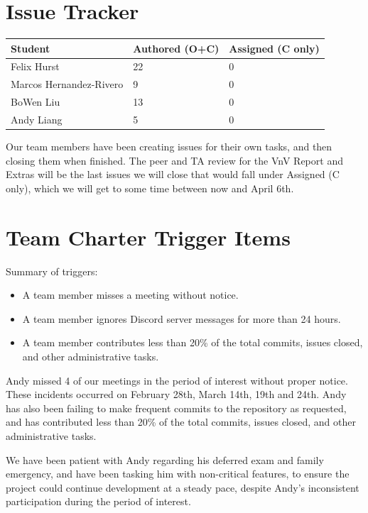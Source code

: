 \documentclass{article}
\begin{document}
\section{Issue Tracker}

\begin{table}[H]
\centering
\begin{tabular}{lll}
\toprule
\textbf{Student} & \textbf{Authored (O+C)} & \textbf{Assigned (C only)}\\
\midrule
Felix Hurst & 22 & 0 \\
Marcos Hernandez-Rivero & 9 & 0 \\
BoWen Liu & 13 & 0 \\
Andy Liang & 5 & 0 \\
\bottomrule
\end{tabular}
\end{table}

Our team members have been creating issues for their own tasks, and then
closing them when finished. The peer and TA review for the VnV Report and Extras
will be the last issues we will close that would fall under Assigned (C only),
which we will get to some time between now and April 6th.

\section{Team Charter Trigger Items}

Summary of triggers:
\begin{itemize}
    \item A team member misses a meeting without notice.
    \item A team member ignores Discord server messages for more than 24 hours.
    \item A team member contributes less than 20\% of the total commits, issues closed, and other administrative tasks.
\end{itemize}

Andy missed 4 of our meetings in the period of interest without proper notice.
These incidents occurred on February 28th, March 14th, 19th and 24th.
Andy has also been failing to make frequent commits to the repository as
requested, and has contributed less than 20\% of the total commits, issues closed,
and other administrative tasks.

We have been patient with Andy regarding his deferred exam and family emergency,
and have been tasking him with non-critical features, to ensure the project could
continue development at a steady pace, despite Andy's inconsistent participation during
the period of interest.
\end{document}

